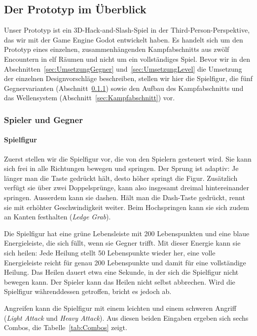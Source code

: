 \documentclass[../Main.tex]{subfiles}
\begin{document}
\subsection{Der Prototyp im Überblick} \label{sec:Prototyp}

Unser Prototyp ist ein 3D-Hack-and-Slash-Spiel in der Third-Person-Perspektive, das wir mit der Game Engine Godot entwickelt haben. Es handelt sich um den Prototyp eines einzelnen, zusammenhängenden Kampfabschnitts aus zwölf Encountern in elf Räumen und nicht um ein vollständiges Spiel. Bevor wir in den Abschnitten~\ref{sec:UmsetzungGegner} und~\ref{sec:UmsetzungLevel} die Umsetzung der einzelnen Designvorschläge beschreiben, stellen wir hier die Spielfigur, die fünf Gegnervarianten (Abschnitt~\ref{sec:Gegnertypen}) sowie den Aufbau des Kampfabschnitts und das Wellensystem (Abschnitt~\ref{sec:Kampfabschnitt}) vor.

\subsubsection{Spieler und Gegner} \label{sec:Gegnertypen}

\paragraph{Spielfigur}
Zuerst stellen wir die Spielfigur vor, die von den Spielern gesteuert wird. Sie kann sich frei in alle Richtungen bewegen und springen. Der Sprung ist adaptiv: Je länger man die Taste gedrückt hält, desto höher springt die Figur. Zusätzlich verfügt sie über zwei Doppelsprünge, kann also insgesamt dreimal hintereinander springen. Ausserdem kann sie dashen. Hält man die Dash-Taste gedrückt, rennt sie mit erhöhter Geschwindigkeit weiter. Beim Hochspringen kann sie sich zudem an Kanten festhalten (\textit{Ledge Grab}).

Die Spielfigur hat eine grüne Lebensleiste mit 200 Lebenspunkten und eine blaue Energieleiste, die sich füllt, wenn sie Gegner trifft. Mit dieser Energie kann sie sich heilen: Jede Heilung stellt 50 Lebenspunkte wieder her, eine volle Energieleiste reicht für genau 200 Lebenspunkte und damit für eine vollständige Heilung. Das Heilen dauert etwa eine Sekunde, in der sich die Spielfigur nicht bewegen kann. Der Spieler kann das Heilen nicht selbst abbrechen. Wird die Spielfigur währenddessen getroffen, bricht es jedoch ab.

Angreifen kann die Spielfigur mit einem leichten und einem schweren Angriff (\textit{Light Attack} und \textit{Heavy Attack}). Aus diesen beiden Eingaben ergeben sich sechs Combos, die Tabelle~\ref{tab:Combos} zeigt.
\end{document}
